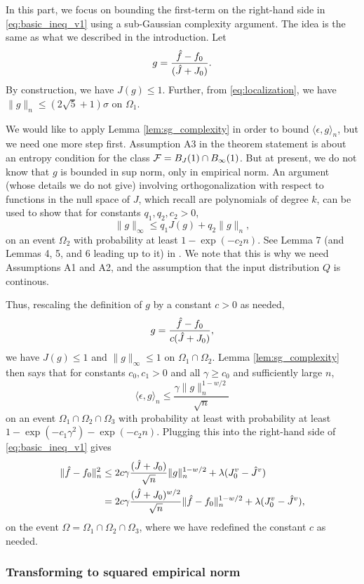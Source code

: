 \documentclass{article}
\begin{document}
In this part, we focus on bounding the first-term on the right-hand side in 
\eqref{eq:basic_ineq_v1} using a sub-Gaussian complexity argument. The idea is
the same as what we described in the introduction. Let
\[
g = \frac{\hat{f}-f_0}{({\hat J} + J_0)}.
\]
By construction, we have $J(g) \leq 1$. Further, from \eqref{eq:localization},
we have $\|g\|_n \leq (2{\sqrt 5} + 1) \sigma$ on $\Omega_1$.  

We would like to apply Lemma \ref{lem:sg_complexity} in order to bound $\langle 
\epsilon, g \rangle_n$, but we need one more step first. Assumption A3 in the
theorem statement is about an entropy condition for the class $\mathcal{F} = B_J(1) \cap
B_\infty(1)$. But at present, we do not know that $g$ is bounded in sup norm,
only in empirical norm. An argument (whose details we do not give) involving
orthogonalization with respect to functions in the null space of $J$, which
recall are polynomials of degree $k$, can be used to show that for constants
$q_1,q_2,c_2>0$, 
\[
\|g\|_\infty \leq q_1 J(g) + q_2 \|g\|_n,
\]
on an event $\Omega_2$ with probability at least $1-\exp(-c_2 n)$. See Lemma 7
(and Lemmas 4, 5, and 6 leading up to it) in \citet{sadhanala2019additive}. We
note that this is why we need Assumptions A1 and A2, and the assumption that the 
input distribution $Q$ is continous.   

Thus, rescaling the definition of $g$ by a constant $c>0$ as needed, 
\[
g = \frac{\hat{f}-f_0}{c({\hat J} + J_0)},
\]
we have $J(g) \leq 1$ and $\|g\|_\infty \leq 1$ on $\Omega_1 \cap
\Omega_2$. Lemma \ref{lem:sg_complexity} then says that for constants
$c_0,c_1>0$ and all $\gamma \geq c_0$ and sufficiently large $n$,     
\[
\langle \epsilon, g \rangle_n \leq \frac{\gamma \|g\|_n^{1-w/2}}{\sqrt n} 
\]
on an event $\Omega_1 \cap \Omega_2 \cap \Omega_3$ with probability at least 
with probability at least $1 - \exp(-c_1\gamma^2) - \exp(-c_2n)$. Plugging this 
into the right-hand side of \eqref{eq:basic_ineq_v1} gives 
\begin{align}
\nonumber
\|\hat{f} - f_0\|_n^2 &\leq 2c \gamma \frac{({\hat J} + J_0)}{\sqrt n}
 \|g\|_n^{1-w/2} + \lambda (J_0^v - {\hat J}^v) \\ 
\label{eq:basic_ineq_v2}
&= 2c \gamma \frac{({\hat J} + J_0)^{w/2}}{\sqrt n} \|\hat{f}-f_0\|_n^{1-w/2} +
  \lambda (J_0^v - {\hat J}^v), 
\end{align} 
on the event $\Omega = \Omega_1 \cap \Omega_2 \cap \Omega_3$, where we have
redefined the constant $c$ as needed.

\subsubsection{Transforming to squared empirical norm} 
\end{document}
